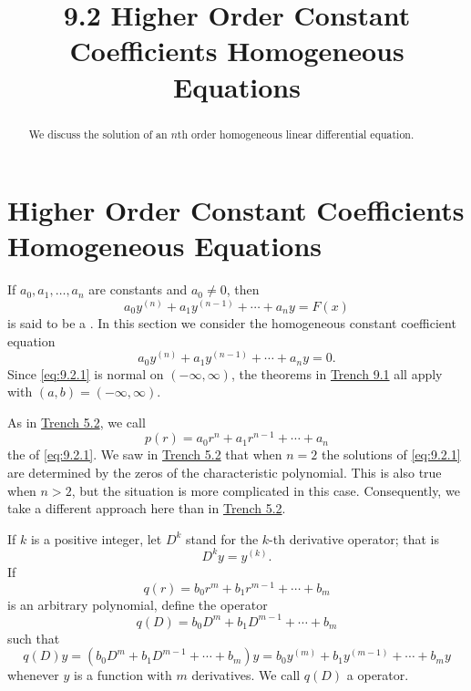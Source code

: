 \documentclass{ximera}
\title{9.2 Higher Order Constant Coefficients Homogeneous Equations}%
\begin{document}
\begin{abstract}
We discuss the solution of an $n$th order homogeneous linear differential equation.
\end{abstract}

\maketitle

\section*{Higher Order Constant Coefficients Homogeneous Equations}

If $a_0, a_1, \dots, a_n$ are constants and $a_0\neq 0$, then
$$
a_0y^{(n)}+a_1y^{(n-1)}+\cdots+a_ny=F(x)
$$
is said to be a .
In this section we consider the homogeneous constant coefficient
equation
\begin{equation} \label{eq:9.2.1}
a_0y^{(n)}+a_1y^{(n-1)}+\cdots+a_ny=0.
\end{equation}
Since \eqref{eq:9.2.1} is normal on $(-\infty,\infty)$, the theorems in
\href{https://ximera.osu.edu/ode/main/linearHigherOrder/linearHigherOrder}{Trench 9.1} all apply with $(a,b)=(-\infty,\infty)$.

As in \href{https://ximera.osu.edu/ode/main/constantCoefficientHomogeneousEquations/constantCoefficientHomogeneousEquations}{Trench 5.2}, we call
\begin{equation} \label{eq:9.2.2}
p(r)=a_0r^n+a_1r^{n-1}+\cdots+a_n
\end{equation}
the  of \eqref{eq:9.2.1}. We saw in
\href{https://ximera.osu.edu/ode/main/constantCoefficientHomogeneousEquations/constantCoefficientHomogeneousEquations}{Trench 5.2} that when $n=2$ the solutions of \eqref{eq:9.2.1} are
determined by the zeros of the characteristic polynomial. This is also
true when $n>2$, but the situation is more complicated in this case.
Consequently, we take a different approach here than in
\href{https://ximera.osu.edu/ode/main/constantCoefficientHomogeneousEquations/constantCoefficientHomogeneousEquations}{Trench 5.2}.

If $k$ is a positive integer, let $D^k$ stand
for the $k$-th derivative operator;   that is
$$
D^ky=y^{(k)}.
$$
If
$$
q(r)=b_0r^m+b_1r^{m-1}+\cdots+b_m
$$
is an arbitrary polynomial,  define the operator
$$
q(D)=b_0D^m+b_1D^{m-1}+\cdots+b_m
$$
such that
$$
q(D)y=(b_0D^m+b_1D^{m-1}+\cdots+b_m)y=b_0y^{(m)}+b_1y^{(m-1)}+\cdots+
b_my
$$
whenever $y$ is a function with $m$ derivatives. We call $q(D)$
a   operator.
\end{document}
